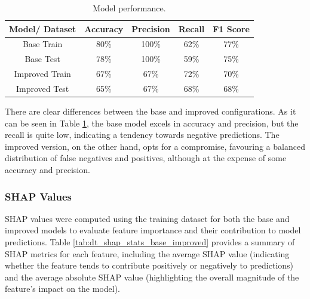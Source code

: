 \documentclass[fleqn,10pt]{wlscirep}
\begin{document}
\begin{table}[!htb]
\centering
\begin{tabular}{|c|c|c|c|c|}
\hline

\textbf{Model/ Dataset} & \textbf{Accuracy} & \textbf{Precision} & \textbf{Recall} & \textbf{F1 Score} \\ \hline
     Base Train &     80\% &     100\% &   62\% &     77\% \\
      Base Test &     78\% &     100\% &   59\% &     75\% \\
Improved Train &     67\% &      67\% &   72\% &     70\% \\
 Improved Test &     65\% &      67\% &   68\% &     68\% \\

\hline
\end{tabular}
\caption{Model performance.}
\label{tab_perf_tdrogas:}
\end{table}


There are clear differences between the base and improved configurations. As it can be seen in Table \ref{tab_perf_tdrogas:}, the base model excels in accuracy and precision, but the recall is quite low, indicating a tendency towards negative predictions. The improved version, on the other hand, opts for a compromise, favouring a balanced distribution of false negatives and positives, although at the expense of some accuracy and precision.


\subsubsection{SHAP Values}

SHAP values were computed using the training dataset for both the base and improved models to evaluate feature importance and their contribution to model predictions. Table \ref{tab:dt_shap_stats_base_improved} provides a summary of SHAP metrics for each feature, including the average SHAP value (indicating whether the feature tends to contribute positively or negatively to predictions) and the average absolute SHAP value (highlighting the overall magnitude of the feature's impact on the model).
\end{document}

